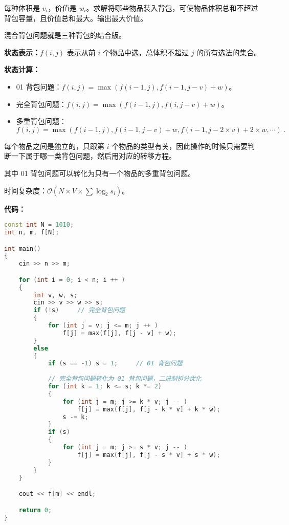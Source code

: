 每种体积是 $v_i$，价值是 $w_i$。求解将哪些物品装入背包，可使物品体积总和不超过背包容量，且价值总和最大。输出最大价值。

混合背包问题就是三种背包的结合版。

\textbf{状态表示：$f(i, j)$} 表示从前 $i$ 个物品中选，总体积不超过 $j$ 的所有选法的集合。

\textbf{状态计算：}

\begin{itemize}
\item 01 背包问题：$f(i, j) = \max(f(i - 1, j), f(i - 1, j - v) + w)$。
\item 完全背包问题：$f(i, j) = \max(f(i - 1, j), f(i, j - v) + w)$。
\item 多重背包问题：
\begin{equation}
f(i, j) = \max(f(i - 1, j), f(i - 1, j - v) + w, f(i - 1, j - 2 \times v) + 2 \times w , \cdots)~.
\end{equation}
\end{itemize}

每个物品之间是独立的，只跟第 $i$ 个物品的类型有关，因此操作的时候只需要判断一下属于哪一类背包问题，然后用对应的转移方程。

其中 01 背包问题可以转化为只有一个物品的多重背包问题。

时间复杂度：$\mathcal{O}(N \times V \times \sum \log_2 s_i)$。

\textbf{代码：}

\begin{lstlisting}[language=cpp]
const int N = 1010;
int n, m, f[N];

int main()
{
    cin >> n >> m;

    for (int i = 0; i < n; i ++ )
    {
        int v, w, s;
        cin >> v >> w >> s;
        if (!s)     // 完全背包问题
        {
            for (int j = v; j <= m; j ++ )
                f[j] = max(f[j], f[j - v] + w);
        }
        else
        {
            if (s == -1) s = 1;     // 01 背包问题
            
            // 完全背包问题转化为 01 背包问题，二进制拆分优化
            for (int k = 1; k <= s; k *= 2)
            {
                for (int j = m; j >= k * v; j -- )
                    f[j] = max(f[j], f[j - k * v] + k * w);
                s -= k;
            }
            if (s)
            {
                for (int j = m; j >= s * v; j -- )
                    f[j] = max(f[j], f[j - s * v] + s * w);
            }
        }
    }

    cout << f[m] << endl;

    return 0;
}
\end{lstlisting}

